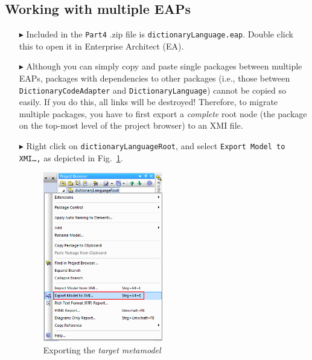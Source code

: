 \newpage
\subsection{Working with multiple EAPs}
\visHeader
\label{sec:multiEAP}

\begin{itemize}

\item[$\blacktriangleright$] Included in the \texttt{Part4} .zip file is \texttt{dictionaryLanguage.eap}. Double click this to open it in
Enterprise Architect (EA).

\vspace{0.5cm}

\item[$\blacktriangleright$] Although you can simply copy and paste single packages between multiple EAPs, packages with dependencies to other packages (i.e.,
those between \texttt{DictionaryCodeAdapter} and \texttt{DictionaryLanguage}) cannot be copied so easily. If you do this, all links will be destroyed!
Therefore, to migrate multiple packages, you have to first export a \emph{complete} root node (the package on the top-most level of the project browser) to an
XMI file.

\vspace{0.5cm}

\item[$\blacktriangleright$] Right click on \texttt{dictionaryLanguageRoot}, and select \texttt{Export Model to XMI\ldots,} as depicted in
Fig.~\ref{fig:export}.

\vspace{0.5cm}

\begin{figure}[htbp]
\begin{center}
  \includegraphics[width=0.5\textwidth]{ea_exportToXMI}
  \caption{Exporting the \emph{target metamodel}}
  \label{fig:export}
\end{center}
\end{figure}


\end{itemize}
